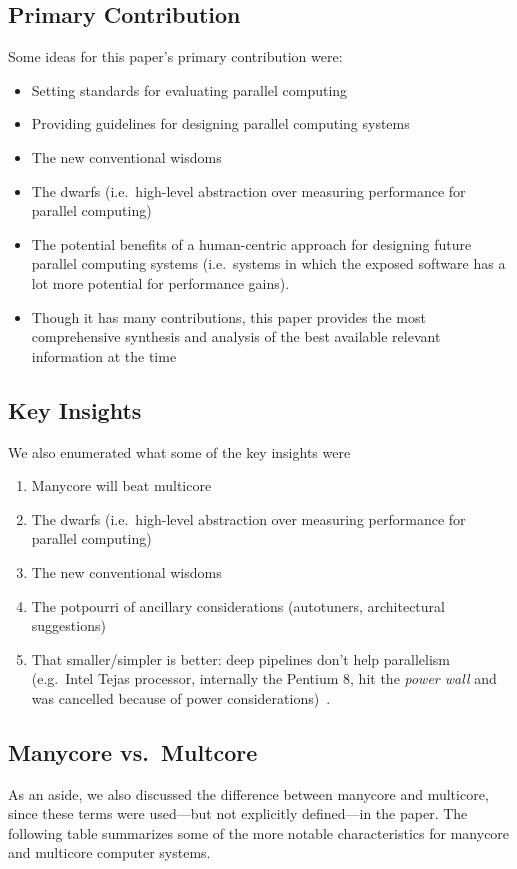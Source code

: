\subsection{Primary Contribution}\label{feb-11:a-view:contribution}
Some ideas for this paper's primary contribution were:
\begin{itemize}
    \item Setting standards for evaluating parallel computing
    \item Providing guidelines for designing parallel computing systems
    \item The new conventional wisdoms
    \item The dwarfs (i.e.\ high-level abstraction over measuring performance for parallel computing)
    \item The potential benefits of a human-centric approach for designing future parallel computing systems (i.e.\ systems in which the exposed software has a lot more potential for performance gains).
    \item Though it has many contributions, this paper provides the most comprehensive synthesis and analysis of the best available relevant information at the time
\end{itemize}

\subsection{Key Insights}\label{feb-11:a-view:insights}

We also enumerated what some of the key insights were
\begin{enumerate}
    \item Manycore will beat multicore
    \item The dwarfs (i.e.\ high-level abstraction over measuring performance for parallel computing)
    \item The new conventional wisdoms
    \item The potpourri of ancillary considerations (autotuners, architectural suggestions)
    \item That smaller/simpler is better: deep pipelines don't help parallelism (e.g.\ Intel Tejas processor, internally the Pentium 8, hit the \textit{power wall} and was cancelled because of power considerations)~\cite{Tejas}.
\end{enumerate}

\subsection{Manycore vs.\ Multcore}\label{feb-11:a-view:many-vs-multi}
As an aside, we also discussed the difference between manycore and multicore, since these terms were used---but not explicitly defined---in the paper. The following table summarizes some of the more notable characteristics for manycore and multicore computer systems.

